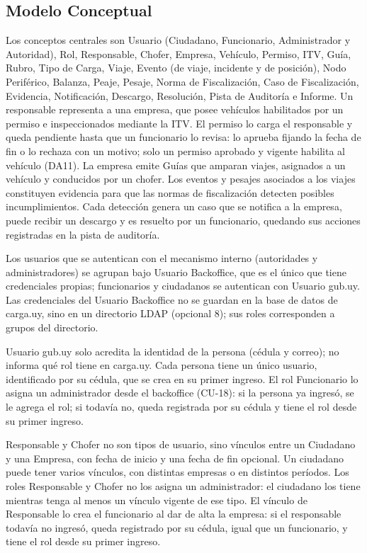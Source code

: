 \subsection{Modelo Conceptual}

Los conceptos centrales son Usuario (Ciudadano, Funcionario, Administrador y Autoridad), Rol, Responsable, Chofer, Empresa, Vehículo, Permiso, ITV, Guía, Rubro, Tipo de Carga, Viaje, Evento (de viaje, incidente y de posición), Nodo Periférico, Balanza, Peaje, Pesaje, Norma de Fiscalización, Caso de Fiscalización, Evidencia, Notificación, Descargo, Resolución, Pista de Auditoría e Informe. Un responsable representa a una empresa, que posee vehículos habilitados por un permiso e inspeccionados mediante la ITV. El permiso lo carga el responsable y queda pendiente hasta que un funcionario lo revisa: lo aprueba fijando la fecha de fin o lo rechaza con un motivo; solo un permiso aprobado y vigente habilita al vehículo (DA11). La empresa emite Guías que amparan viajes, asignados a un vehículo y conducidos por un chofer. Los eventos y pesajes asociados a los viajes constituyen evidencia para que las normas de fiscalización detecten posibles incumplimientos. Cada detección genera un caso que se notifica a la empresa, puede recibir un descargo y es resuelto por un funcionario, quedando sus acciones registradas en la pista de auditoría.

Los usuarios que se autentican con el mecanismo interno (autoridades y administradores) se agrupan bajo Usuario Backoffice, que es el único que tiene credenciales propias; funcionarios y ciudadanos se autentican con Usuario gub.uy. Las credenciales del Usuario Backoffice no se guardan en la base de datos de carga.uy, sino en un directorio LDAP (opcional 8); sus roles corresponden a grupos del directorio.

Usuario gub.uy solo acredita la identidad de la persona (cédula y correo); no informa qué rol tiene en carga.uy. Cada persona tiene un único usuario, identificado por su cédula, que se crea en su primer ingreso. El rol Funcionario lo asigna un administrador desde el backoffice (CU-18): si la persona ya ingresó, se le agrega el rol; si todavía no, queda registrada por su cédula y tiene el rol desde su primer ingreso.

Responsable y Chofer no son tipos de usuario, sino vínculos entre un Ciudadano y una Empresa, con fecha de inicio y una fecha de fin opcional. Un ciudadano puede tener varios vínculos, con distintas empresas o en distintos períodos. Los roles Responsable y Chofer no los asigna un administrador: el ciudadano los tiene mientras tenga al menos un vínculo vigente de ese tipo. El vínculo de Responsable lo crea el funcionario al dar de alta la empresa: si el responsable todavía no ingresó, queda registrado por su cédula, igual que un funcionario, y tiene el rol desde su primer ingreso.

